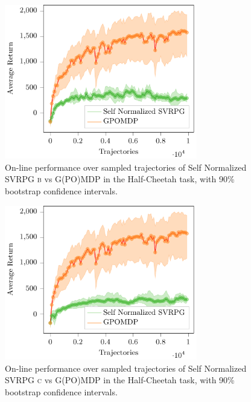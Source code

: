 \begin{figure}[h]
	\begin{minipage}[h]{1\textwidth}
		\centering
		\includegraphics[width=0.75\textwidth]{Images/Experiments/half_cheetah_GPOMDP_vs_SN_SVRPG_B.pdf}
		\vspace{-0.1in}
		\caption{On-line performance over sampled trajectories of Self Normalized \acs{SVRPG} \textsc{b} vs G(PO)MDP in the Half-Cheetah task, with 90\% bootstrap confidence intervals.}
		\label{fig:hcfive}
	\end{minipage}
	\vspace{-0.15in}
\end{figure}
\begin{figure}[h]
	\begin{minipage}[h]{1\textwidth}
		\centering
		\includegraphics[width=0.75\textwidth]{Images/Experiments/half_cheetah_GPOMDP_vs_SN_SVRPG_C.pdf}
		\vspace{-0.1in}
		\caption{On-line performance over sampled trajectories of Self Normalized \acs{SVRPG} \textsc{c} vs G(PO)MDP in the Half-Cheetah task, with 90\% bootstrap confidence intervals.}
		\label{fig:hcsix}
	\end{minipage}
	\vspace{-0.15in}
\end{figure}


